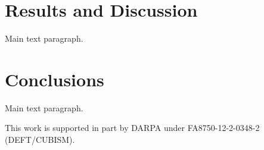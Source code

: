 \documentclass[remotesensing,article,accept,moreauthors,pdftex,12pt,a4paper]{mdpi}
\begin{document}
\section{Results and Discussion}

Main text paragraph.













\section{Conclusions}

Main text paragraph.



This work is supported in part by DARPA under
FA8750-12-2-0348-2 (DEFT/CUBISM).









\end{document}
